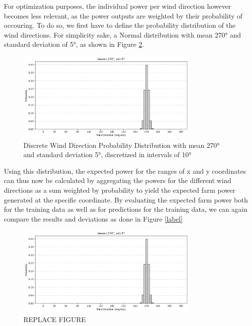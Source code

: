 For optimization purposes, the individual power per wind direction however becomes less relevant, as the power outputs are weighted by their probability of occouring. 
To do so, we first have to define the probability distribution of the wind directions. For simplicity sake, a Normal distribution with mean 270° and standard deviation of 5°, as shown in Figure \ref{fig:wind_dist_opti}.


\begin{figure}[h] 
	\centering
	\includegraphics[width=0.8\textwidth]{figures/optimization/wind_dist_opti.png} 
	\caption{Discrete Wind Direction Probability Distribution with mean 270° and standard deviation 5°, discretized in intervals of 10° }
	\label{fig:wind_dist_opti}
\end{figure}


Using this distribution, the expected power for the ranges of x and y coordinates can thus now be calculated by aggregating the powers for the different wind directions as a sum weighted by probability to yield the expected farm power generated at the specific coordinate. By evaluating the expected farm power both for the training data as well as for predictions for the training data, we can again compare the results and deviations as done in Figure \ref{label} 

\begin{figure}[h] 
	\centering
	\includegraphics[width=0.8\textwidth]{figures/optimization/wind_dist_opti.png} 
	\caption{REPLACE FIGURE }
	\label{fig:wind_dist_opti}
\end{figure}



